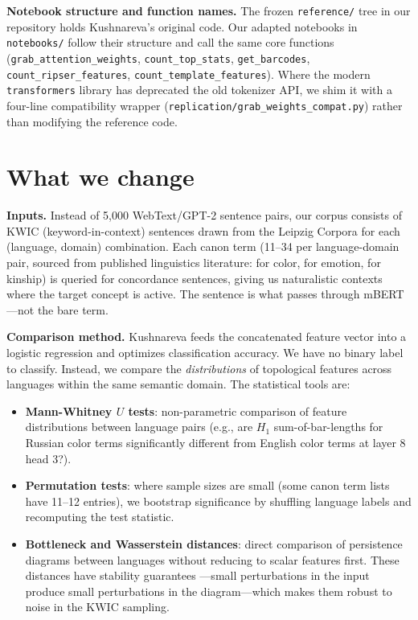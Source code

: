\textbf{Notebook structure and function names.} The frozen \texttt{reference/} tree in our repository holds Kushnareva's original code. Our adapted notebooks in \texttt{notebooks/} follow their structure and call the same core functions (\texttt{grab\_attention\_weights}, \texttt{count\_top\_stats}, \texttt{get\_barcodes}, \texttt{count\_ripser\_features}, \texttt{count\_template\_features}). Where the modern \texttt{transformers} library has deprecated the old tokenizer API, we shim it with a four-line compatibility wrapper (\texttt{replication/grab\_weights\_compat.py}) rather than modifying the reference code.

\section{What we change}

\textbf{Inputs.} Instead of 5,000 WebText/GPT-2 sentence pairs, our corpus consists of KWIC (keyword-in-context) sentences drawn from the Leipzig Corpora for each (language, domain) combination. Each canon term (11--34 per language-domain pair, sourced from published linguistics literature: \textcite{berlin1969} for color, \textcite{wierzbicka1999} for emotion, \textcite{murdock1949} for kinship) is queried for concordance sentences, giving us naturalistic contexts where the target concept is active. The sentence is what passes through mBERT---not the bare term.

\textbf{Comparison method.} Kushnareva feeds the concatenated feature vector into a logistic regression and optimizes classification accuracy. We have no binary label to classify. Instead, we compare the \emph{distributions} of topological features across languages within the same semantic domain. The statistical tools are:

\begin{itemize}
  \item \textbf{Mann-Whitney $U$ tests}: non-parametric comparison of feature distributions between language pairs (e.g., are $H_1$ sum-of-bar-lengths for Russian color terms significantly different from English color terms at layer 8 head 3?).
  \item \textbf{Permutation tests}: where sample sizes are small (some canon term lists have 11--12 entries), we bootstrap significance by shuffling language labels and recomputing the test statistic.
  \item \textbf{Bottleneck and Wasserstein distances}: direct comparison of persistence diagrams between languages without reducing to scalar features first. These distances have stability guarantees \parencite{cohensteiner2007}---small perturbations in the input produce small perturbations in the diagram---which makes them robust to noise in the KWIC sampling.
\end{itemize}


